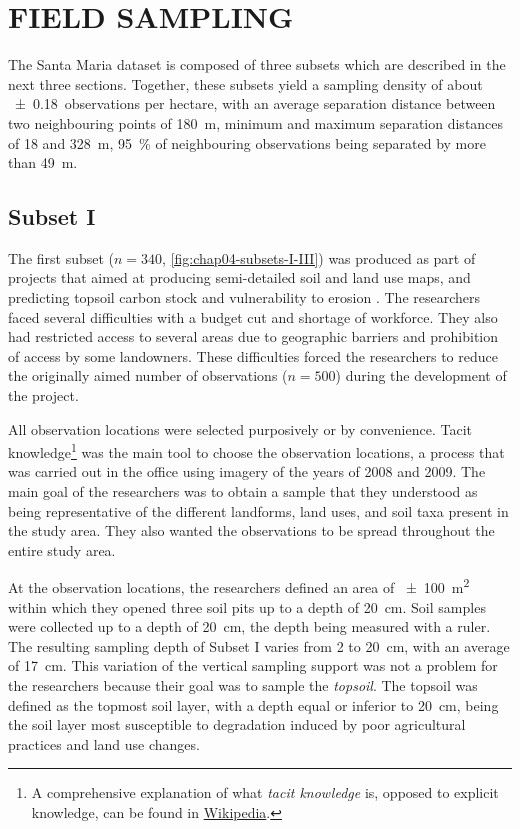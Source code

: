 \section{FIELD SAMPLING}
\label{sec:chap04-sampling}

The Santa Maria dataset is composed of three subsets which are described in the next three sections. Together, 
these subsets yield a sampling density of about \num{\pm0.18}~observations per hectare, with an average 
separation 
distance between two neighbouring points of \SI{180}{\metre}, minimum and maximum separation distances of 
\num{18} and \SI{328}{\metre}, \SI{95}{\percent} of neighbouring observations being separated by more than 
\SI{49}{\metre}.

\subsection{Subset I}

The first subset ($n = 340$, \autoref{fig:chap04-subsets-I-III}) was produced as part of projects that aimed 
at producing semi-detailed soil and land use maps, and predicting topsoil carbon stock and vulnerability to 
erosion \cite{Samuel-Rosa2009, SamuelRosaEtAl2011a, MiguelEtAl2012, Moura-BuenoEtAl2012, Samuel-RosaEtAl2013}. 
The researchers faced several difficulties with a budget cut and shortage of workforce. They also had 
restricted access to several areas due to geographic barriers and prohibition of access by some landowners. 
These difficulties forced the researchers to reduce the originally aimed number of observations ($n = 500$) 
during the development of the project.

\def\foottacit{\footnote{A comprehensive explanation of what \emph{tacit knowledge} is, opposed to explicit 
knowledge, can be found in \href{https://en.wikipedia.org/wiki/Tacit_knowledge}{Wikipedia}.}}

All observation locations were selected purposively or by convenience. Tacit knowledge\foottacit{} was the 
main tool to choose the observation locations, a process that was carried out in the office using 
\googleearth{} 
imagery of the years of \num{2008} and \num{2009}. The main goal of the researchers was to obtain a sample 
that 
they understood as being representative of the different landforms, land uses, and soil taxa present in the 
study area. They also wanted the observations to be spread throughout the entire study area.

At the observation locations, the researchers defined an area of \SI{\pm100}{\metre\squared} within which they 
opened three soil pits up to a depth of \SI{20}{\centi\metre}. Soil samples were collected up to a depth of 
\SI{20}{\centi\metre}, the depth being measured with a ruler. The resulting sampling depth of Subset I varies 
from \num{2} to \SI{20}{\centi\metre}, with an average of \SI{17}{\centi\metre}. This variation of the 
vertical 
sampling support was not a problem for the researchers because their goal was to sample the \emph{topsoil}. 
The topsoil was defined as the topmost soil layer, with a depth equal or inferior to \SI{20}{\centi\metre}, 
being 
the soil layer most susceptible to degradation induced by poor agricultural practices and land use changes.


